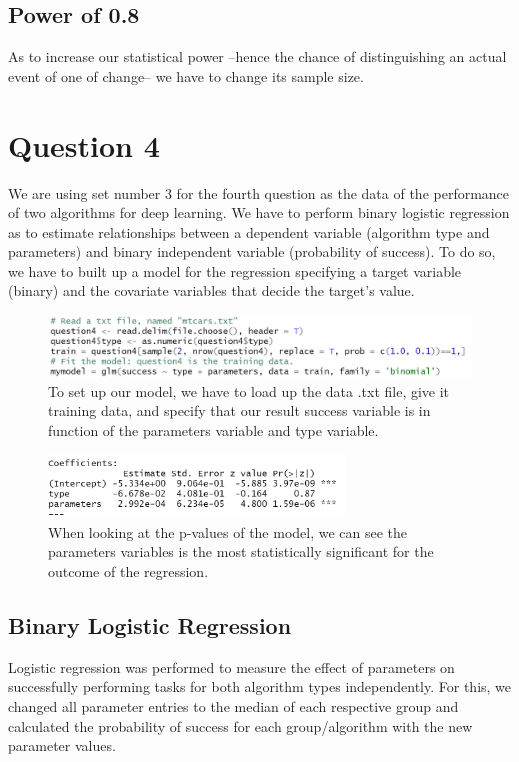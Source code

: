 \documentclass[14]{article}
\begin{document}
\subsection{Power of 0.8}
As to increase our statistical power --hence the chance of distinguishing an actual event of one of change-- we have to change its sample size.

\section{Question 4}
We are using set number 3 for the fourth question as the data of the performance of two algorithms for deep learning. We have to perform binary logistic regression as to estimate relationships between a dependent variable (algorithm type and parameters) and binary independent variable (probability of success). To do so, we have to built up a model for the regression specifying a target variable (binary) and the covariate variables that decide the target's value.

\begin{figure}[!htb]
	\includegraphics[width=1.0\textwidth]{img/question4/question4_model_code.PNG}
	\captionsetup{width=1.0\textwidth}
	\centering 
	\caption{To set up our model, we have to load up the data .txt file, give it training data, and specify that our result success variable is in function of the parameters variable and type variable. }
\end{figure}

\begin{figure}[!htb]
	\includegraphics[width=0.7\textwidth]{img/question4/question4_model_coef.PNG}
	\captionsetup{width=1.0\textwidth}
	\centering 
	\caption{When looking at the p-values of the model, we can see the parameters variables is the most statistically significant for the outcome of the regression. }
\end{figure}

\subsection{Binary Logistic Regression}
Logistic regression was performed to measure the effect of parameters on successfully performing tasks for both algorithm types independently. For this, we changed all parameter entries to the median of each respective group and calculated the probability of success for each group/algorithm with the new parameter values.
\end{document}
